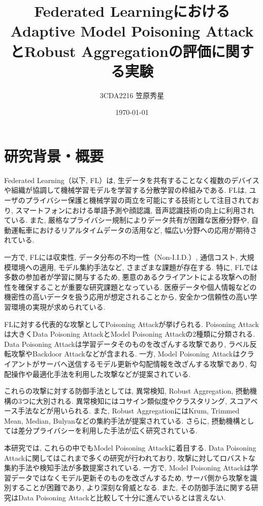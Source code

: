 \documentclass[a4j, twocolumn, dvipdfmx]{jsarticle}  %
\title{
Federated LearningにおけるAdaptive Model Poisoning AttackとRobust Aggregationの評価に関する実験
}
\author{3CDA2216 笠原秀星}
\date{\today}
\begin{document}
\maketitle  %

\section{研究背景・概要}

Federated Learning（以下, FL）は, 生データを共有することなく複数のデバイスや組織が協調して機械学習モデルを学習する分散学習の枠組みである\cite{mammen2021fl}.
FLは, ユーザのプライバシー保護と機械学習の両立を可能にする技術として注目されており, スマートフォンにおける単語予測や顔認識, 音声認識技術の向上に利用されている. また, 厳格なプライバシー規制によりデータ共有が困難な医療分野や, 自動運転車におけるリアルタイムデータの活用など, 幅広い分野への応用が期待されている\cite{li2019fl}.

一方で, FLには収束性, データ分布の不均一性（Non-I.I.D.）, 通信コスト, 大規模環境への適用, モデル集約手法など, さまざまな課題が存在する\cite{ma2020privacy}. 特に, FLでは多数の参加者が学習に関与するため, 悪意のあるクライアントによる攻撃への耐性を確保することが重要な研究課題となっている. 医療データや個人情報などの機密性の高いデータを扱う応用が想定されることから, 安全かつ信頼性の高い学習環境の実現が求められている.

FLに対する代表的な攻撃としてPoisoning Attackが挙げられる. Poisoning Attackは大きくData Poisoning AttackとModel Poisoning Attackの2種類に分類される. Data Poisoning Attackは学習データそのものを改ざんする攻撃であり, ラベル反転攻撃やBackdoor Attackなどが含まれる. 一方, Model Poisoning Attackはクライアントがサーバへ送信するモデル更新や勾配情報を改ざんする攻撃であり, 勾配操作や最適化手法を利用した攻撃などが提案されている.

これらの攻撃に対する防御手法としては, 異常検知, Robust Aggregation, 摂動機構の3つに大別される. 異常検知にはコサイン類似度やクラスタリング, スコアベース手法などが用いられる. また, Robust AggregationにはKrum, Trimmed Mean, Median, Bulyanなどの集約手法が提案されている. さらに, 摂動機構としては差分プライバシーを利用した手法が広く研究されている\cite{sagar2023survey}.

本研究では, これらの中でもModel Poisoning Attackに着目する. Data Poisoning Attackに関してはこれまで多くの研究が行われており, 攻撃に対してロバストな集約手法や検知手法が多数提案されている. 一方で, Model Poisoning Attackは学習データではなくモデル更新そのものを改ざんするため, サーバ側から攻撃を識別することが困難であり, より深刻な脅威となる. また, その防御手法に関する研究はData Poisoning Attackと比較して十分に進んでいるとは言えない.
\end{document}
